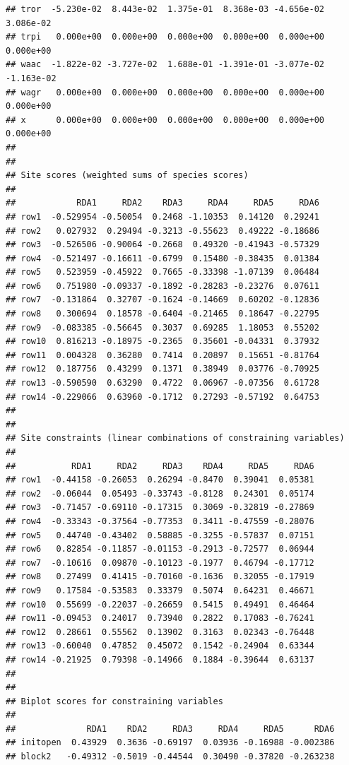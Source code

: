 \documentclass[
]{article}
\begin{document}
\begin{verbatim}
## tror  -5.230e-02  8.443e-02  1.375e-01  8.368e-03 -4.656e-02  3.086e-02
## trpi   0.000e+00  0.000e+00  0.000e+00  0.000e+00  0.000e+00  0.000e+00
## waac  -1.822e-02 -3.727e-02  1.688e-01 -1.391e-01 -3.077e-02 -1.163e-02
## wagr   0.000e+00  0.000e+00  0.000e+00  0.000e+00  0.000e+00  0.000e+00
## x      0.000e+00  0.000e+00  0.000e+00  0.000e+00  0.000e+00  0.000e+00
## 
## 
## Site scores (weighted sums of species scores)
## 
##            RDA1     RDA2    RDA3     RDA4     RDA5     RDA6
## row1  -0.529954 -0.50054  0.2468 -1.10353  0.14120  0.29241
## row2   0.027932  0.29494 -0.3213 -0.55623  0.49222 -0.18686
## row3  -0.526506 -0.90064 -0.2668  0.49320 -0.41943 -0.57329
## row4  -0.521497 -0.16611 -0.6799  0.15480 -0.38435  0.01384
## row5   0.523959 -0.45922  0.7665 -0.33398 -1.07139  0.06484
## row6   0.751980 -0.09337 -0.1892 -0.28283 -0.23276  0.07611
## row7  -0.131864  0.32707 -0.1624 -0.14669  0.60202 -0.12836
## row8   0.300694  0.18578 -0.6404 -0.21465  0.18647 -0.22795
## row9  -0.083385 -0.56645  0.3037  0.69285  1.18053  0.55202
## row10  0.816213 -0.18975 -0.2365  0.35601 -0.04331  0.37932
## row11  0.004328  0.36280  0.7414  0.20897  0.15651 -0.81764
## row12  0.187756  0.43299  0.1371  0.38949  0.03776 -0.70925
## row13 -0.590590  0.63290  0.4722  0.06967 -0.07356  0.61728
## row14 -0.229066  0.63960 -0.1712  0.27293 -0.57192  0.64753
## 
## 
## Site constraints (linear combinations of constraining variables)
## 
##           RDA1     RDA2     RDA3    RDA4     RDA5     RDA6
## row1  -0.44158 -0.26053  0.26294 -0.8470  0.39041  0.05381
## row2  -0.06044  0.05493 -0.33743 -0.8128  0.24301  0.05174
## row3  -0.71457 -0.69110 -0.17315  0.3069 -0.32819 -0.27869
## row4  -0.33343 -0.37564 -0.77353  0.3411 -0.47559 -0.28076
## row5   0.44740 -0.43402  0.58885 -0.3255 -0.57837  0.07151
## row6   0.82854 -0.11857 -0.01153 -0.2913 -0.72577  0.06944
## row7  -0.10616  0.09870 -0.10123 -0.1977  0.46794 -0.17712
## row8   0.27499  0.41415 -0.70160 -0.1636  0.32055 -0.17919
## row9   0.17584 -0.53583  0.33379  0.5074  0.64231  0.46671
## row10  0.55699 -0.22037 -0.26659  0.5415  0.49491  0.46464
## row11 -0.09453  0.24017  0.73940  0.2822  0.17083 -0.76241
## row12  0.28661  0.55562  0.13902  0.3163  0.02343 -0.76448
## row13 -0.60040  0.47852  0.45072  0.1542 -0.24904  0.63344
## row14 -0.21925  0.79398 -0.14966  0.1884 -0.39644  0.63137
## 
## 
## Biplot scores for constraining variables
## 
##              RDA1    RDA2     RDA3     RDA4     RDA5      RDA6
## initopen  0.43929  0.3636 -0.69197  0.03936 -0.16988 -0.002386
## block2   -0.49312 -0.5019 -0.44544  0.30490 -0.37820 -0.263238

\end{verbatim}
\end{document}
